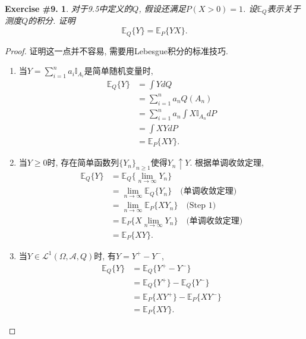 \documentclass[UTF8, a4paper]{article}
\newtheorem{exercise}{Exercise \#9.}
\begin{document}
\begin{framed}
\begin{exercise}
对于9.5中定义的\(Q\), 假设还满足\(P(X > 0) = 1\).
设\(\mathbb{E}_Q\)表示关于测度\(Q\)的积分. 证明 
$$
\mathbb{E}_Q \{Y\} = \mathbb{E}_P \{YX\}.
$$
\end{exercise}
\end{framed}


\begin{proof}
证明这一点并不容易, 需要用Lebesgue积分的标准技巧.
\begin{enumerate}[Step 1]
    \item 当\(Y = \sum_{i=1}^{n}a_i \mathbb{I}_{A_i}\)是简单随机变量时, $$
    \begin{aligned}
        \mathbb{E}_Q\{Y\} &= \int Y dQ \\
        &= \sum_{i=1}^{n} a_n Q(A_n) \\
        & = \sum_{i=1}^{n} a_n \int X \mathbb{I}_{A_n} dP\\
        &= \int X Y dP \\ 
        &= \mathbb{E}_P\{XY\}.
    \end{aligned}
    $$
    \item 当\(Y \geq 0\)时, 存在简单函数列\(\{Y_n\}_{n\geq 1}\)使得\(Y_n \uparrow Y\). 根据单调收敛定理, $$
    \begin{aligned}
        \mathbb{E}_Q\{Y\} &= \mathbb{E}_Q\{\lim_{n\to \infty} Y_n\} \\
        &=\lim_{n\to \infty} \mathbb{E}_Q\{Y_n\} \quad \text{(单调收敛定理)} \\
        &= \lim_{n \to \infty} \mathbb{E}_P\{XY_n\} \quad \text{(Step 1)} \\
        &=\mathbb{E}_P \{X \lim_{n\to \infty}Y_n\} \quad \text{(单调收敛定理)} \\
        &=\mathbb{E}_P\{XY\}.
    \end{aligned}
    $$
    \item 当\(Y \in \mathcal{L}^1 (\Omega, \mathcal{A}, Q)\)时, 有\(Y = Y^+ - Y^-\), $$
    \begin{aligned}
        \mathbb{E}_Q\{Y\} &= \mathbb{E}_Q\{ Y^+ - Y^- \} \\
        &= \mathbb{E}_Q\{ Y^+\} - \mathbb{E}_Q\{ Y^- \} \\
        &= \mathbb{E}_P\{XY^+\} - \mathbb{E}_P\{XY^-\} \\
        &= \mathbb{E}_P\{XY\}.
    \end{aligned}
    $$
\end{enumerate}
\end{proof}
\end{document}
